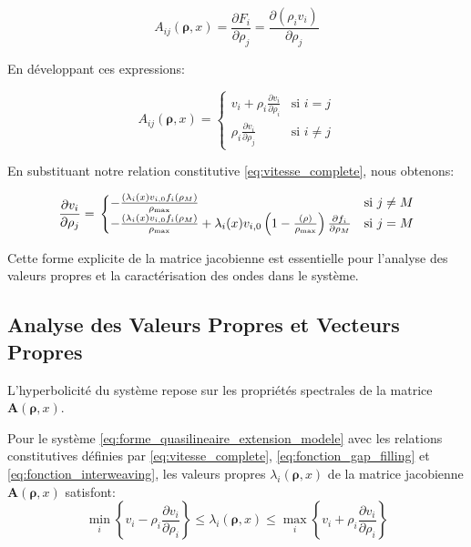\begin{equation}
A_{ij}(\boldsymbol{\rho}, x) = \frac{\partial F_i}{\partial \rho_j} = \frac{\partial (\rho_i v_i)}{\partial \rho_j}
\end{equation}

En développant ces expressions:

\begin{equation}
A_{ij}(\boldsymbol{\rho}, x) = 
\begin{cases}
v_i + \rho_i \frac{\partial v_i}{\partial \rho_i} & \text{si } i = j \\
\rho_i \frac{\partial v_i}{\partial \rho_j} & \text{si } i \neq j
\end{cases}
\end{equation}

En substituant notre relation constitutive \eqref{eq:vitesse_complete}, nous obtenons:

\begin{equation}
\frac{\partial v_i}{\partial \rho_j} = 
\\
\begin{cases}
-\frac{(\lambda_i(x) v_{i,0} f_i(\rho_M)}{\rho_{\max}} & \text{si } j \neq M \\
-\frac{(\lambda_i(x) v_{i,0} f_i(\rho_M)}{\rho_{\max}} + \lambda_i(x) v_{i,0} \left(1 - \frac{(\rho)}{\rho_{\max}}\right) \frac{\partial f_i}{\partial \rho_M} & \text{si } j = M
\end{cases}
\end{equation}

Cette forme explicite de la matrice jacobienne est essentielle pour l'analyse des valeurs propres et la caractérisation des ondes dans le système.

\subsection{Analyse des Valeurs Propres et Vecteurs Propres}
\label{subsec:valeurs_propres}

L'hyperbolicité du système repose sur les propriétés spectrales de la matrice $\mathbf{A}(\boldsymbol{\rho}, x)$.

\begin{theorem}
Pour le système \eqref{eq:forme_quasilineaire_extension_modele} avec les relations constitutives définies par \eqref{eq:vitesse_complete}, \eqref{eq:fonction_gap_filling} et \eqref{eq:fonction_interweaving}, les valeurs propres $\lambda_i(\boldsymbol{\rho}, x)$ de la matrice jacobienne $\mathbf{A}(\boldsymbol{\rho}, x)$ satisfont:
\begin{equation}
 \min_{i} \left\{v_i - \rho_i \frac{\partial v_i}{\partial \rho_i}\right\} \leq \lambda_i(\boldsymbol{\rho}, x) \leq \max_{i} \left\{v_i + \rho_i \frac{\partial v_i}{\partial \rho_i}\right\}
\end{equation}

\end{theorem}

